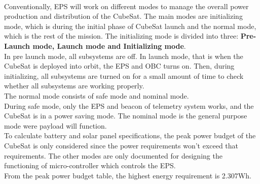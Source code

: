 \\
 Conventionally, EPS will work on different modes to manage the overall power production and distribution of the CubeSat. The main modes are initializing mode, which is during the initial phase of CubeSat launch and the normal mode, which is the rest of the mission. The initializing mode is divided into three: {\bf Pre- Launch mode, Launch mode and Initializing mode}. 
 \\In pre launch mode, all subsystems are off. In launch mode, that is when the CubeSat is deployed into orbit, the EPS and OBC turns on. Then, during initializing, all subsystems are turned on for a small amount of time to check whether all subsystems are working properly. \\The normal mode consists of safe mode and nominal mode. \\During safe mode, only the EPS and beacon of telemetry system works, and the CubeSat is in a power saving mode. The nominal mode is the general purpose mode were payload will function.
 \\
 To calculate battery and solar panel specifications, the peak power budget of the CubeSat is only considered since the power requirements won’t exceed that requirements. The other modes are only documented for designing the functioning of micro-controller which controls the EPS.
 \\
 From the peak power budget table, the highest energy requirement is 2.307Wh.
 \\
